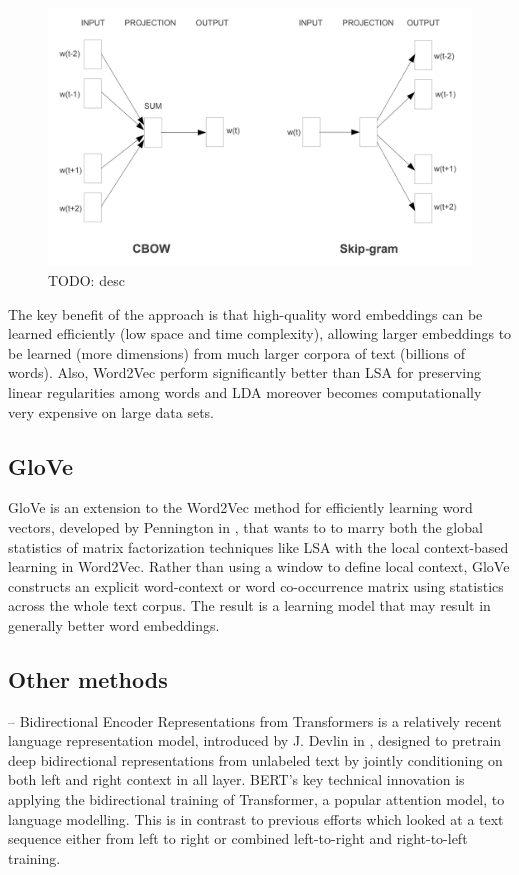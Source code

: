 \begin{figure}
  \includegraphics[width=\textwidth]{figures/word2vec-training-models.png}
  \caption[TODO]{TODO: desc}
  \label{fig:word2vec-learning-models}
\end{figure}

The key benefit of the approach is that high-quality word embeddings
can be learned efficiently (low space and time complexity), allowing
larger embeddings to be learned (more dimensions) from much larger
corpora of text (billions of words). Also, Word2Vec perform
significantly better than LSA for preserving linear regularities among
words and LDA moreover becomes computationally very expensive on
large data sets.

\subsection{GloVe}

GloVe is an extension to the Word2Vec method for efficiently learning
word vectors, developed by Pennington \etal{} in ,
that wants to to marry both the global statistics of matrix
factorization techniques like LSA with the local context-based
learning in Word2Vec. Rather than using a window to define local
context, GloVe constructs an explicit word-context or word
co-occurrence matrix using statistics across the whole text corpus.
The result is a learning model that may result in generally better
word embeddings.

\subsection{Other methods}

 -- Bidirectional Encoder Representations from Transformers is a relatively recent language representation model, introduced by J. Devlin \etal{} in ,  designed to pretrain deep bidirectional representations from
unlabeled text by jointly conditioning on both left and right context in all layer. BERT’s key technical innovation is applying the bidirectional training of Transformer, a popular attention model, to language modelling. This is in contrast to previous efforts which looked at a text sequence either from left to right or combined left-to-right and right-to-left training.

